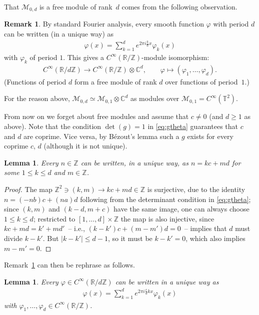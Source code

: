 \documentclass[10pt,a4paper]{amsart}
\numberwithin{equation}{section}
\newtheorem{lem}[thm]{Lemma}
\theoremstyle{definition}
\newtheorem{rem}[thm]{Remark}
\newcommand{\R}{\mathbb{R}}
\newcommand{\C}{\mathbb{C}}
\newcommand{\Z}{\mathbb{Z}}
\newcommand{\T}{\mathbb{T}}
\begin{document}
That $\mathcal{M}_{0,d}$ is a free module of rank~$d$ comes from the following observation.

\begin{rem}\label{rem:6.1}
By standard Fourier analysis, every smooth function $\varphi$ with period $d$ can be written (in a unique way) as
\begin{gather*}
\varphi(x)=\sum_{k=1}^de^{2\pi i\frac{k}{d}x}\varphi_k(x)
\end{gather*}
with $\varphi_k$ of period $1$. This gives a $C^\infty(\R/\Z)$-module isomorphism:
\begin{gather*}
C^\infty(\R/d\Z) \to C^\infty(\R/\Z)\otimes\C^d ,\qquad
\varphi\mapsto (\varphi_1,\ldots,\varphi_d) .
\end{gather*}
(Functions of period $d$ form a free module of rank $d$ over functions of period~$1$.)
\end{rem}

For the reason above, $\mathcal{M}_{0,d}\simeq \mathcal{M}_{0,1}\otimes\C^d$ as modules over $\mathcal{M}_{0,1}=C^\infty(\T^2)$.

From now on we forget about free modules and assume that $c\neq 0$ (and $d\geq 1$ as above). Note that the condition
$\det(g)=1$ in \eqref{eq:gtheta} guarantees that
$c$ and $d$ are coprime. Vice versa,
by B{\'e}zout's lemma such a $g$ exists for every coprime $c$, $d$ (although it is not unique).

\begin{lem}\label{lemma:unique}
Every $n\in\Z$ can be written, in a unique way, as $n=kc+md$ for some $1\leq k\leq d$ and $m\in\Z$.
\end{lem}

\begin{proof}
The map $\Z^2\ni (k,m)\to kc+md\in\Z$ is surjective, due to the identity
$n=(-nb)c+(na)d$ following from the determinant condition in \eqref{eq:gtheta}; since $(k,m)$
and $(k-d,m+c)$ have the same image, one can always choose $1\leq k\leq d$; restricted to
$[1,\ldots,d]\times\Z$ the map is also injective,
since $kc+md=k'+md'$~-- i.e., $(k-k')c+(m-m')d=0$~-- implies that $d$ must divide $k-k'$. But
$|k-k'|\leq d-1$, so it must be $k-k'=0$,
which also implies $m-m'=0$.
\end{proof}

Remark~\ref{rem:6.1} can then be rephrase as follows.

\begin{lem}
Every $\varphi\in C^\infty(\R/d\Z)$ can be written in a unique way as
\begin{gather*}
\varphi(x)=\sum_{k=1}^de^{2\pi i\frac{c}{d}kx}\varphi_k(x)
\end{gather*}
with $\varphi_1,\ldots,\varphi_d\in C^\infty(\R/\Z)$.
\end{lem}
\end{document}
